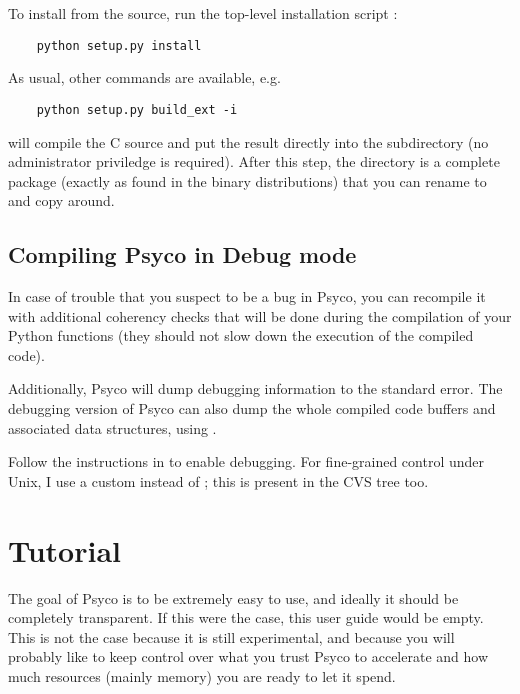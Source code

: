\documentclass{manual}
\begin{document}
To install from the source, run the top-level installation script :

\begin{verbatim}
    python setup.py install
\end{verbatim}

As usual, other commands are available, e.g.\ 

\begin{verbatim}
    python setup.py build_ext -i
\end{verbatim}

will compile the C source and put the result directly into the  subdirectory (no administrator priviledge is required). After this step, the  directory is a complete package (exactly as found in the binary distributions) that you can rename to  and copy around.


\section{Compiling Psyco in Debug mode}\label{debugpsyco}

In case of trouble that you suspect to be a bug in Psyco, you can recompile it with additional coherency checks that will be done during the compilation of your Python functions (they should not slow down the execution of the compiled code).

Additionally, Psyco will dump debugging information to the standard error.  The debugging version of Psyco can also dump the whole compiled code buffers and associated data structures, using .

Follow the instructions in  to enable debugging.  For fine-grained control under Unix, I use a custom  instead of ; this  is present in the CVS tree too.



\chapter{Tutorial}

The goal of Psyco is to be extremely easy to use, and ideally it should be completely transparent.  If this were the case, this user guide would be empty.  This is not the case because it is still experimental, and because you will probably like to keep control over what you trust Psyco to accelerate and how much resources (mainly memory) you are ready to let it spend.
\end{document}
